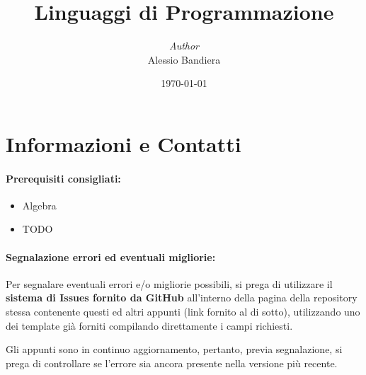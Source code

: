 \documentclass[a4paper, 12pt]{report}
\institute{\curlyquotes{\hspace{0.25mm}Sapienza} Università di Roma}
\title{Linguaggi di Programmazione}
\author{\textit{Author}\\Alessio Bandiera}
\date{\today}
\begin{document}
    \maketitle

    {
        \hypersetup{allcolors=black}

        \romantableofcontents
    }

    \chapter*{Informazioni e Contatti}      %
    
    \subsubsection{Prerequisiti consigliati:}
    \begin{itemize}
        \item Algebra
        \item TODO
    \end{itemize}

    \quad

    \subsubsection{Segnalazione errori ed eventuali migliorie:}
    
    Per segnalare eventuali errori e/o migliorie possibili, si prega di utilizzare il \textbf{sistema di Issues fornito da GitHub} all'interno della pagina della repository stessa contenente questi ed altri appunti (link fornito al di sotto), utilizzando uno dei template già forniti compilando direttamente i campi richiesti.

    Gli appunti sono in continuo aggiornamento, pertanto, previa segnalazione, si prega di controllare se l'errore sia ancora presente nella versione più recente.
\end{document}
